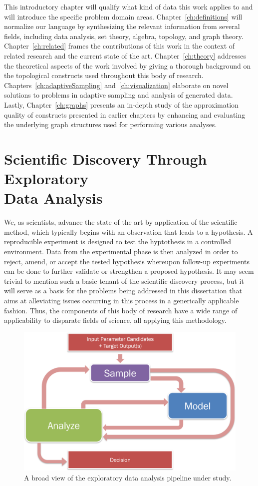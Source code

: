 This introductory chapter will qualify what kind of data this work applies to and will introduce the specific problem domain areas.
%
Chapter~\ref{ch:definitions} will normalize our language by synthesizing the relevant information from several fields, including data analysis, set theory, algebra, topology, and graph theory.
%
Chapter~\ref{ch:related} frames the contributions of this work in the context of related research and the current state of the art.
%
Chapter~\ref{ch:theory} addresses the theoretical aspects of the work involved by giving a thorough background on the topological constructs used throughout this body of research.
%
Chapters~\ref{ch:adaptiveSampling} and~\ref{ch:visualization} elaborate on novel solutions to problems in adaptive sampling and analysis of generated data.
%
Lastly, Chapter~\ref{ch:graphs} presents an in-depth study of the approximation quality of constructs presented in earlier chapters by enhancing and evaluating the underlying graph structures used for performing various analyses.

\section{Scientific Discovery Through Exploratory\\Data Analysis}

We, as scientists, advance the state of the art by application of the scientific method, which typically begins with an observation that leads to a hypothesis.
%
A reproducible experiment is designed to test the hyptothesis in a controlled environment.
%
Data from the experimental phase is then analyzed in order to reject, amend, or accept the tested hypothesis whereupon follow-up experiments can be done to further validate or strengthen a proposed hypothesis.
%
It may seem trivial to mention such a basic tenant of the scientific discovery process, but it will serve as a basis for the problems being addressed in this dissertation that aims at alleviating issues occurring in this process in a generically applicable fashion.
%
Thus, the components of this body of research have a wide range of applicability to disparate fields of science, all applying this methodology.

\begin{figure}[b]
  \centering
  \includegraphics[width=.65\textwidth]{figs/chap1/pipeline}
  \caption[Data collection cycle for scientific discovery]{A broad view of the exploratory data analysis pipeline under study.}
  \label{fig:dataCycle}
\end{figure}

